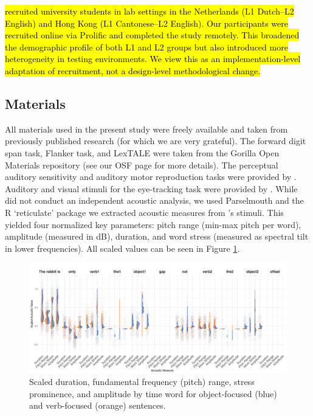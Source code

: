 \cite{ge2021a} \hl{recruited university students in lab settings in the Netherlands (L1 Dutch–L2 English) and Hong Kong (L1 Cantonese–L2 English). Our participants were recruited online via Prolific and completed the study remotely. This broadened the demographic profile of both L1 and L2 groups but also introduced more heterogeneity in testing environments. We view this as an implementation-level adaptation of recruitment, not a design-level methodological change.}

\subsection{Materials}
All materials used in the present study were freely available and taken from previously published research (for which we are very grateful). The forward digit span task, Flanker task, and LexTALE \parencite{lemhofer2012introducing} were taken from the Gorilla \parencite{Anwyl-Irvine_2019} Open Materials repository (see our OSF page for more details). The perceptual auditory sensitivity and auditory motor reproduction tasks were provided by \cite{Kachlicka_Saito_Tierney_2019, saito2020domain}. Auditory and visual stimuli for the eye-tracking task were provided by \cite{ge2021a}. While \cite{ge2021a} did not conduct an independent acoustic analysis, we used  Parselmouth \parencite{jadoul2018introducing} and the R `reticulate' package \parencite{Ushey2022} we extracted acoustic measures from \cite{ge2021a}'s stimuli. This yielded four normalized key parameters: pitch range (min-max pitch per word), amplitude (measured in dB), duration, and word stress (measured as spectral tilt in lower frequencies). All scaled values can be seen in Figure \ref{fig:acoustic_faceted}.

\begin{figure}[H]  %
    \centering
    \includegraphics[width=\textwidth,height=\textheight,keepaspectratio]{viz/acoustic_faceted.png}
    \caption{Scaled duration, fundamental frequency (pitch) range, stress prominence, and amplitude by time word for object-focused (blue) and verb-focused (orange) sentences.}
    \label{fig:acoustic_faceted}
\end{figure}


